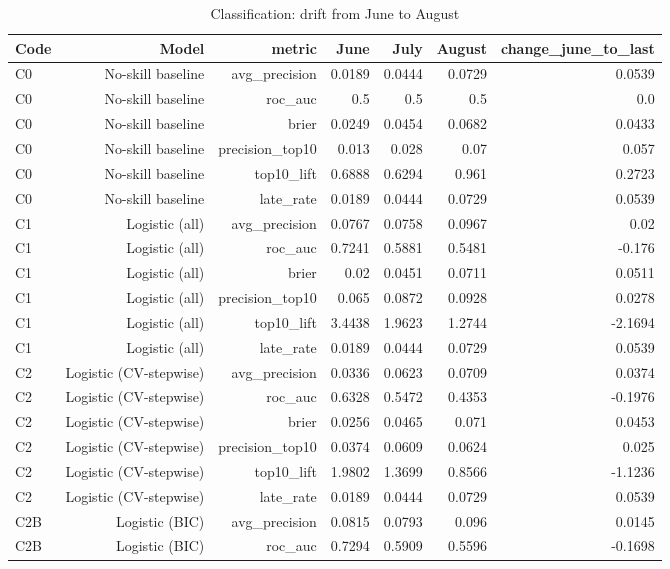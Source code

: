 \begin{table}[htbp]
\centering
\small
\caption{Classification: drift from June to August}
\begin{tabular}{lrrrrrr}
\toprule
Code & Model & metric & June & July & August & change\_june\_to\_last \\
\midrule
C0 & No-skill baseline & avg\_precision & 0.0189 & 0.0444 & 0.0729 & 0.0539 \\
C0 & No-skill baseline & roc\_auc & 0.5 & 0.5 & 0.5 & 0.0 \\
C0 & No-skill baseline & brier & 0.0249 & 0.0454 & 0.0682 & 0.0433 \\
C0 & No-skill baseline & precision\_top10 & 0.013 & 0.028 & 0.07 & 0.057 \\
C0 & No-skill baseline & top10\_lift & 0.6888 & 0.6294 & 0.961 & 0.2723 \\
C0 & No-skill baseline & late\_rate & 0.0189 & 0.0444 & 0.0729 & 0.0539 \\
C1 & Logistic (all) & avg\_precision & 0.0767 & 0.0758 & 0.0967 & 0.02 \\
C1 & Logistic (all) & roc\_auc & 0.7241 & 0.5881 & 0.5481 & -0.176 \\
C1 & Logistic (all) & brier & 0.02 & 0.0451 & 0.0711 & 0.0511 \\
C1 & Logistic (all) & precision\_top10 & 0.065 & 0.0872 & 0.0928 & 0.0278 \\
C1 & Logistic (all) & top10\_lift & 3.4438 & 1.9623 & 1.2744 & -2.1694 \\
C1 & Logistic (all) & late\_rate & 0.0189 & 0.0444 & 0.0729 & 0.0539 \\
C2 & Logistic (CV-stepwise) & avg\_precision & 0.0336 & 0.0623 & 0.0709 & 0.0374 \\
C2 & Logistic (CV-stepwise) & roc\_auc & 0.6328 & 0.5472 & 0.4353 & -0.1976 \\
C2 & Logistic (CV-stepwise) & brier & 0.0256 & 0.0465 & 0.071 & 0.0453 \\
C2 & Logistic (CV-stepwise) & precision\_top10 & 0.0374 & 0.0609 & 0.0624 & 0.025 \\
C2 & Logistic (CV-stepwise) & top10\_lift & 1.9802 & 1.3699 & 0.8566 & -1.1236 \\
C2 & Logistic (CV-stepwise) & late\_rate & 0.0189 & 0.0444 & 0.0729 & 0.0539 \\
C2B & Logistic (BIC) & avg\_precision & 0.0815 & 0.0793 & 0.096 & 0.0145 \\
C2B & Logistic (BIC) & roc\_auc & 0.7294 & 0.5909 & 0.5596 & -0.1698 \\

\end{tabular}
\end{table}

